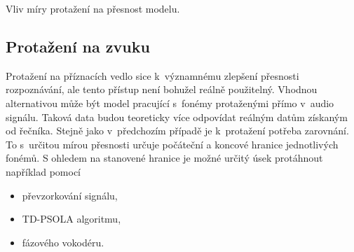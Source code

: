 \begin{table}[htpb]
  \centering
  \def\arraystretch{1.5}
  \caption{Vliv míry protažení na přesnost modelu.}
  \label{tab:realisation:augmentation:influence}
\end{table}


\subsection{Protažení na zvuku}
\label{chap:realisation:augmentation:audio}

Protažení na příznacích vedlo sice  k~významnému zlepšení přesnosti rozpoznávání, ale tento přístup není bohužel reálně použitelný. Vhodnou alternativou může být model pracující s~fonémy protaženými přímo v~audio signálu.
Taková data budou teoreticky více odpovídat reálným datům získaným od řečníka.
Stejně jako v~předchozím případě je  k~protažení potřeba zarovnání.
To s~určitou mírou přesnosti určuje počáteční a koncové hranice jednotlivých fonémů.
S ohledem na stanovené hranice je možné určitý úsek protáhnout například pomocí

\begin{itemize}
  \item převzorkování signálu,
  \item TD-PSOLA algoritmu,
  \item fázového vokodéru.
\end{itemize}

